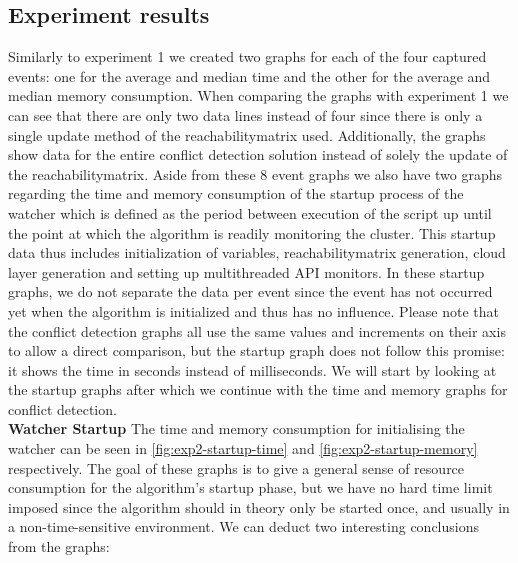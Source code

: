 \subsection{Experiment results} \label{exp2:results}
Similarly to experiment 1 we created two graphs for each of the four captured events: one for the average and median time and the other for the average and median memory consumption. When comparing the graphs with experiment 1 we can see that there are only two data lines instead of four since there is only a single update method of the reachabilitymatrix used. Additionally, the graphs show data for the entire conflict detection solution instead of solely the update of the reachabilitymatrix. Aside from these 8 event graphs we also have two graphs regarding the time and memory consumption of the startup process of the watcher which is defined as the period between execution of the script up until the point at which the algorithm is readily monitoring the cluster. This startup data thus includes initialization of variables, reachabilitymatrix generation, cloud layer generation and setting up multithreaded API monitors. In these startup graphs, we do not separate the data per event since the event has not occurred yet when the algorithm is initialized and thus has no influence. Please note that the conflict detection graphs all use the same values and increments on their axis to allow a direct comparison, but the startup graph does not follow this promise: it shows the time in seconds instead of milliseconds. We will start by looking at the startup graphs after which we continue with the time and memory graphs for conflict detection.
\\[10pt]

\textbf{Watcher Startup}
\newline The time and memory consumption for initialising the watcher can be seen in \autoref{fig:exp2-startup-time} and \autoref{fig:exp2-startup-memory} respectively. The goal of these graphs is to give a general sense of resource consumption for the algorithm's startup phase, but we have no hard time limit imposed since the algorithm should in theory only be started once, and usually in a non-time-sensitive environment. We can deduct two interesting conclusions from the graphs:

